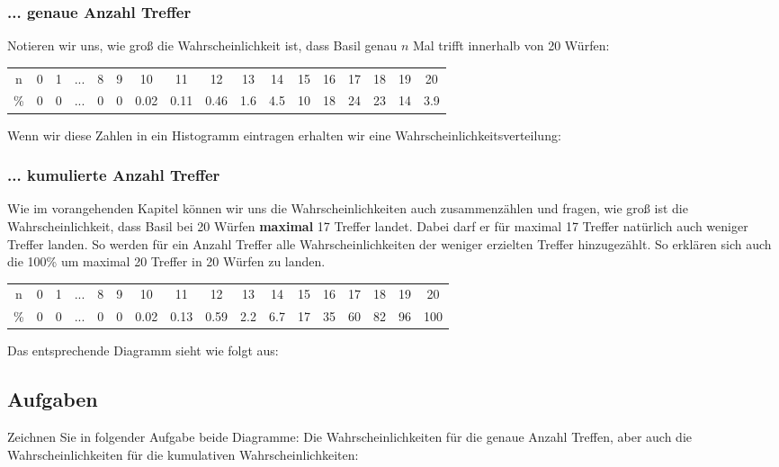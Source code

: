\subsubsection{... genaue Anzahl Treffer}
Notieren wir uns, wie groß die Wahrscheinlichkeit ist, dass Basil genau $n$ Mal trifft innerhalb von 20 Würfen:

\begin{tabular}{c|cccccccccccccccc}
  n & 0 & 1 & ... & 8 & 9 & 10   & 11   & 12   & 13  & 14  & 15 & 16 & 17 & 18 & 19 &  20\\
  \%& 0 & 0 & ... & 0 & 0 & 0.02 & 0.11 & 0.46 & 1.6 & 4.5 & 10 & 18 & 24 & 23 & 14 & 3.9
\end{tabular}

Wenn wir diese Zahlen in ein Histogramm eintragen erhalten wir eine
Wahrscheinlichkeitsverteilung:




\subsubsection{... kumulierte Anzahl Treffer}
Wie im vorangehenden Kapitel können wir uns die Wahrscheinlichkeiten
auch zusammenzählen und \zB fragen, wie groß ist die
Wahrscheinlichkeit, dass Basil bei 20 Würfen \textbf{maximal} 17
Treffer landet. Dabei darf er für maximal 17 Treffer natürlich auch
weniger Treffer landen. So werden für ein Anzahl Treffer alle
Wahrscheinlichkeiten der weniger erzielten Treffer hinzugezählt. So
erklären sich auch die 100\% um maximal 20 Treffer in 20 Würfen zu
landen.

\begin{tabular}{c|cccccccccccccccc}
  n  & 0 & 1 & ... & 8 & 9 & 10  & 11   & 12   & 13  & 14  & 15 & 16 &  17 & 18 & 19 &  20\\
  \% & 0 & 0 & ... & 0 & 0 &  0.02  &0.13   & 0.59 & 2.2 & 6.7 & 17 & 35 &  60 & 82 & 96 & 100
\end{tabular}

Das entsprechende Diagramm sieht wie folgt aus:

\newpage

\subsection*{Aufgaben}

Zeichnen Sie in folgender Aufgabe beide Diagramme: Die
Wahrscheinlichkeiten für die genaue Anzahl Treffen, aber auch die
Wahrscheinlichkeiten für die kumulativen Wahrscheinlichkeiten:

